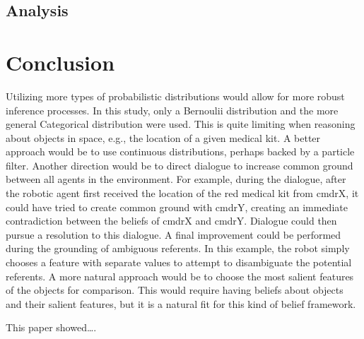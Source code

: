 \documentclass[12pt]{article}
\begin{document}

\subsection{Analysis}
\label{sec:analysis}

\section{Conclusion}
\label{sec:conclusion}


Utilizing more types of probabilistic distributions would allow for
more robust inference processes. In this study, only a Bernoulii
distribution and the more general Categorical distribution were
used. This is quite limiting when reasoning about objects in space,
e.g., the location of a given medical kit. A better approach would be
to use continuous distributions, perhaps backed by a particle filter.
Another direction would be to direct dialogue to increase common
ground between all agents in the environment. For example, during the
dialogue, after the robotic agent first received the location of the
red medical kit from cmdrX, it could have tried to create common
ground with cmdrY, creating an immediate contradiction between the
beliefs of cmdrX and cmdrY. Dialogue could then pursue a resolution to
this dialogue. A final improvement could be performed during the
grounding of ambiguous referents. In this example, the robot simply
chooses a feature with separate values to attempt to disambiguate the
potential referents. A more natural approach would be to choose the
most salient features of the objects for comparison. This would
require having beliefs about objects and their salient features, but
it is a natural fit for this kind of belief framework.

This paper showed\dots.
 {\small }
\end{document}

